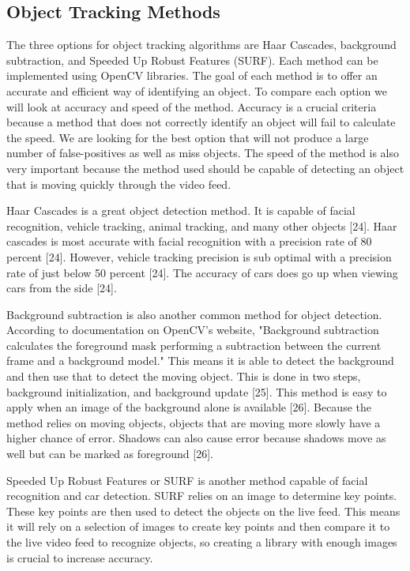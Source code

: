 \documentclass[letterpaper,10pt,onecolumn,draftclsnofoot]{IEEEtran}
\begin{document}
\newpage
\subsection{Object Tracking Methods} %

The three options for object tracking algorithms are Haar Cascades, background subtraction, and Speeded Up Robust Features (SURF).
Each method can be implemented using OpenCV libraries.
The goal of each method is to offer an accurate and efficient way of identifying an object.
To compare each option we will look at accuracy and speed of the method.
Accuracy is a crucial criteria because a method that does not correctly identify an object will fail to calculate the speed.
We are looking for the best option that will not produce a large number of false-positives as well as miss objects.
The speed of the method is also very important because the method used should be capable of detecting an object that is moving quickly through the video feed.


Haar Cascades is a great object detection method.
It is capable of facial recognition, vehicle tracking, animal tracking, and many other objects [24].
Haar cascades is most accurate with facial recognition with a precision rate of 80 percent [24].
However, vehicle tracking precision is sub optimal with a precision rate of just below 50 percent [24].
The accuracy of cars does go up when viewing cars from the side [24].

Background subtraction is also another common method for object detection.
According to documentation on OpenCV's website, "Background subtraction calculates the foreground mask performing a subtraction between the current frame and a background model."
This means it is able to detect the background and then use that to detect the moving object.
This is done in two steps, background initialization, and background update [25].
This method is easy to apply when an image of the background alone is available [26].
Because the method relies on moving objects, objects that are moving more slowly have a higher chance of error.
Shadows can also cause error because shadows move as well but can be marked as foreground [26].

Speeded Up Robust Features or SURF is another method capable of facial recognition and car detection.
SURF relies on an image to determine key points.
These key points are then used to detect the objects on the live feed.
This means it will rely on a selection of images to create key points and then compare it to the live video feed to recognize objects, so creating a library with enough images is crucial to increase accuracy.
\end{document}
